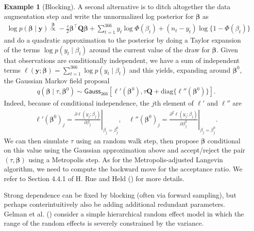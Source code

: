 \documentclass[
  11pt,
  letterpaper,
]{scrbook}
\theoremstyle{definition}
\theoremstyle{plain}
\theoremstyle{plain}
\theoremstyle{plain}
\theoremstyle{definition}
\newtheorem{example}{Example}[chapter]
\theoremstyle{definition}
\theoremstyle{remark}
\begin{document}
\begin{example}[Blocking]
A second alternative is to ditch altogether the data augmentation step
and write the unnormalized log posterior for \(\boldsymbol{\beta}\) as
\begin{align*}
 \log p(\boldsymbol{\beta} \mid \boldsymbol{y}) \stackrel{\boldsymbol{\beta}}{\propto} - \frac{\tau}{2} \boldsymbol{\beta}^\top \mathbf{Q} \boldsymbol{\beta} + \sum_{t=1}^{366} y_{t} \log \Phi(\beta_t) + (n_t-y_{t}) \log\{1-\Phi(\beta_t)\}
\end{align*} and do a quadratic approximation to the posterior by doing
a Taylor expansion of the terms \(\log p(y_{t} \mid \beta_{t})\) around
the current value of the draw for \(\boldsymbol{\beta}.\) Given that
observations are conditionally independent, we have a sum of independent
terms
\(\ell(\boldsymbol{y}; \boldsymbol{\beta}) = \sum_{t=1}^{366}\log p(y_t \mid \beta_t)\)
and this yields, expanding around \(\boldsymbol{\beta}^0\), the Gaussian
Markov field proposal \begin{align*}
q(\boldsymbol{\beta} \mid \tau, \boldsymbol{\beta}^0)  \sim \mathsf{Gauss}_{366}\left[\ell'(\boldsymbol{\beta}^0), \tau\mathbf{Q} + \mathrm{diag}\{\ell''(\boldsymbol{\beta}^0)\}\right].
\end{align*} Indeed, because of conditional independence, the \(j\)th
element of \(\ell'\) and \(\ell''\) are \begin{align*}
\ell'(\boldsymbol{\beta}^0)_j  = \left. \frac{\partial \ell(y_j; \beta_j)}{\partial \beta_j}\right|_{\beta_j = \beta_j^0}, \quad \ell''(\boldsymbol{\beta}^0)_j  = \left. \frac{\partial^2 \ell(y_j; \beta_j)}{\partial \beta_j^2}\right|_{\beta_j = \beta_j^0}.
\end{align*} We can then simulate \(\tau\) using an random walk step,
then propose \(\boldsymbol{\beta}\) conditional on this value using the
Gaussian approximation above and accept/reject the pair
\((\tau, \boldsymbol{\beta})\) using a Metropolis step. As for the
Metropolis-adjusted Langevin algorithm, we need to compute the backward
move for the acceptance ratio. We refer to Section 4.4.1 of H. Rue and
Held () for more details.

\end{example}

Strong dependence can be fixed by blocking (often via forward sampling),
but perhaps conterintuitively also be adding additional redundant
parameters. Gelman et al. () consider a
simple hierarchical random effect model in which the range of the random
effects is severely constrained by the variance.
\end{document}
